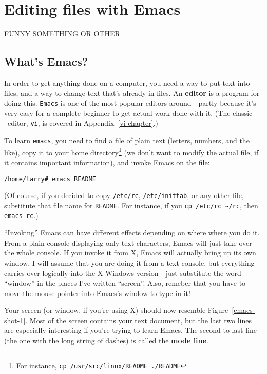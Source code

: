 \chapter{Editing files with Emacs}\label{emacs-chapter}

FUNNY SOMETHING OR OTHER

\section{What's Emacs?}

In order to get anything done on a computer, you need a way to put
text into files, and a way to change text that's already in files.  An
{\bf editor} is a program for doing this.  {\tt Emacs} is one of the
most popular editors around---partly because it's very easy for a
complete beginner to get actual work done with it.  (The classic
\unix\ editor, {\tt vi}, is covered in
Appendix~\ref{vi-chapter}.)

To learn {\tt emacs}, you need to find a file of plain text (letters,
numbers, and the like), copy it to your home directory\footnote{For
  instance, {\tt cp /usr/src/linux/README ./README}} (we don't want to
modify the actual file, if it contains important information), and
invoke Emacs on the file:

\begin{screen}
   \begin{tt}
{\tt /home/larry\# emacs README}
   \end{tt}
\end{screen}

(Of course, if you decided to copy {\tt /etc/rc}, {\tt /etc/inittab},
or any other file, substitute that file name for {\tt README}. For
instance, if you {\tt cp /etc/rc \verb+~+/rc}, then {\tt emacs rc}.)

\xwarn ``Invoking'' Emacs can have different effects depending on where
where you do it.  From a plain console displaying only text
characters, Emacs will just take over the whole console.  If you
invoke it from X, Emacs will actually bring up its own window.
I will assume that you are doing it from a text console, but
everything carries over logically into the X Windows version---just
substitute the word ``window'' in the places I've written
``screen''. Also, remeber that you have to move the mouse pointer into
Emacs's window to type in it!

Your screen (or window, if you're using X) should now resemble
Figure~\ref{emacs-shot-1}. Most of the screen contains your text
document, but the last two lines are especially interesting if you're
trying to learn Emacs. The second-to-last line (the one with the long
string of dashes) is called the {\bf mode line}.


